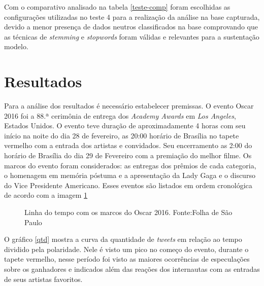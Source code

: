 \begin{table}[]		
	\caption{Comparando testes}
	\label{teste-comp}
\end{table}


Com o comparativo analisado na tabela \ref{teste-comp} foram escolhidas as configurações utilizadas no teste 4 para a realização da análise na base capturada, devido a menor presença de dados neutros classificados na base comprovando que as técnicas de \textit{stemming} e \textit{stopwords} foram válidas e relevantes para a sustentação modelo.

\section{Resultados}\label{result}

Para a análise dos resultados é necessário estabelecer premissas. O evento Oscar 2016 foi a  88.ª cerimônia de entrega dos \textit{Academy Awards} em \textit{Los Angeles}, Estados Unidos. O evento teve duração de aproximadamente 4 horas com seu início na noite do dia 28 de fevereiro, as 20:00 horário de Brasília no tapete vermelho com a entrada dos artistas e convidados. Seu encerramento as 2:00 do horário de Brasília do dia 29 de Fevereiro com a premiação do melhor filme. Os marcos do evento foram considerados: as entregas dos prêmios de cada categoria, o homenagem em memória póstuma e a apresentação da Lady Gaga e o discurso do Vice Presidente Americano. Esses eventos  são listados em ordem cronológica de acordo com a imagem \ref{time}

\begin{figure}[!h]
	\centering{}
	\caption{Linha do tempo com os marcos do Oscar 2016. Fonte:Folha de São Paulo}
	\label{time}
\end{figure}
O gráfico \ref{qtd} mostra a curva da quantidade de \textit{tweets} em relação ao tempo  dividido pela polaridade. Nele é visto um pico  no começo do evento, durante o tapete vermelho, nesse período foi visto as maiores ocorrências de especulações sobre os ganhadores e indicados além das reações dos internautas com as entradas de seus artistas favoritos.

